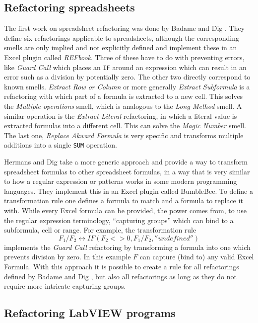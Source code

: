 \documentclass[10pt,conference,compsocconf]{IEEEtran}
\begin{document}
\subsection{Refactoring spreadsheets}

The first work on spreadsheet refactoring was done by Badame and Dig \cite{badame2012refactoring}.
They define six refactorings applicable to spreadsheets, although the corresponding smells are only implied and not explicitly defined and implement these in an Excel plugin called \textit{REFbook}.
Three of these have to do with preventing errors, like \textit{Guard Call} which places an \texttt{IF} around an expression which can result in an error such as a division by potentially zero.
The other two directly correspond to known smells.
\textit{Extract Row or Column} or more generally \textit{Extract Subformula} is a refactoring with which part of a formula is extracted to a new cell.
This solves the \textit{Multiple operations} smell, which is analogous to the \textit{Long Method} \cite{Hermans2012intra} smell.
A similar operation is the \textit{Extract Literal} refactoring, in which a literal value is extracted formulas into a different cell.
This can solve the \textit{Magic Number} smell.
The last one, \textit{Replace Akward Formula} is very specific and transforms multiple additions into a single \texttt{SUM} operation.

Hermans and Dig \cite{hermans2014bumblebee} take a more generic approach and provide a way to transform spreadsheet formulas to other spreadsheet formulas, in a way that is very similar to how a regular expression or patterns works in some modern programming languages.
They implement this in an Excel plugin called BumbleBee.
To define a transformation rule one defines a formula to match and a formula to replace it with. While every Excel formula can be provided, the power comes from, to use the regular expression terminology, ``capturing groups'' which can bind to a subformula, cell or range. For example, the transformation rule
\[F_1/F_2 \leftrightarrow IF(F_2<>0,F_1/F_2,''undefined'')\]
 implements the \textit{Guard Call} \cite{badame2012refactoring} refactoring by transforming a formula into one which prevents division by zero.
 In this example $F$ can capture (bind to) any valid Excel Formula.
 With this approach it is possible to create a rule for all refactorings defined by Badame and Dig \cite{badame2012refactoring}, but also all refactorings as long as they do not require more intricate capturing groups.

\subsection{Refactoring LabVIEW programs}
\end{document}

